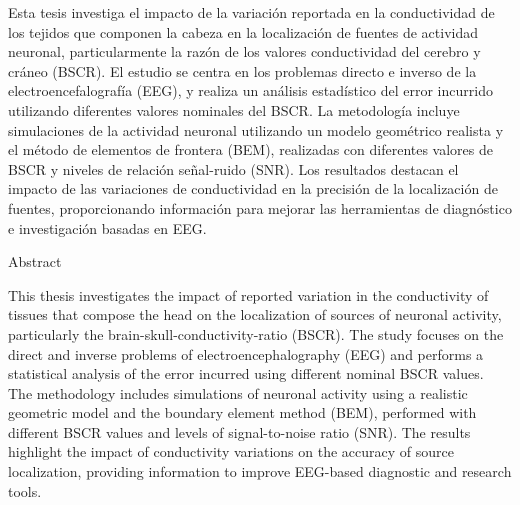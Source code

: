 %

Esta tesis investiga el impacto de la variación reportada en la conductividad de los tejidos que componen la cabeza en la localización de fuentes de actividad neuronal, particularmente la razón de los valores conductividad del cerebro y cráneo (BSCR).
El estudio se centra en los problemas directo e inverso de la electroencefalografía (EEG), y realiza un análisis estadístico del error incurrido utilizando diferentes valores nominales del BSCR.
La metodología incluye simulaciones de la actividad neuronal utilizando un modelo geométrico realista y el método de elementos de frontera (BEM), realizadas con diferentes valores de BSCR y niveles de relación señal-ruido (SNR).
Los resultados destacan el impacto de las variaciones de conductividad en la precisión de la localización de fuentes, proporcionando información para mejorar las herramientas de diagnóstico e investigación basadas en EEG.


\vspace*{20mm}


{Abstract}

This thesis investigates the impact of reported variation in the conductivity of tissues that compose the head on the localization of sources of neuronal activity, particularly the brain-skull-conductivity-ratio (BSCR). 
The study focuses on the direct and inverse problems of electroencephalography (EEG) and performs a statistical analysis of the error incurred using different nominal BSCR values.
The methodology includes simulations of neuronal activity using a realistic geometric model and the boundary element method (BEM), performed with different BSCR values and levels of signal-to-noise ratio (SNR). 
The results highlight the impact of conductivity variations on the accuracy of source localization, providing information to improve EEG-based diagnostic and research tools.

